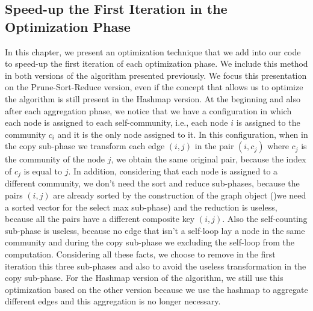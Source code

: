 \subsection{Speed-up the First Iteration in the Optimization Phase}\label{f-1}
In this chapter, we present an optimization technique that we add into our code to speed-up the first iteration of each optimization phase. We include this method in both versions of the algorithm presented previously. We focus this presentation on the Prune-Sort-Reduce version, even if the concept that allows us to optimize the algorithm is still present in the Hashmap version. At the beginning and also after each aggregation phase, we notice that we have a configuration in which each node is assigned to each self-community, i.e., each node $i$ is assigned to the community $c_i$ and it is the only node assigned to it. In this configuration, when in the copy sub-phase we transform each edge $(i,j)$ in the pair $(i,c_j)$ where $c_j$ is the community of the node $j$, we obtain the same original pair, because the index of $c_j$ is equal to $j$. In addition, considering that each node is assigned to a different community, we don't need the sort and reduce sub-phases, because the pairs $(i, j)$ are already sorted by the construction of the graph object ()we need a sorted vector for the select max sub-phase) and the reduction is useless, because all the pairs have a different composite key $(i, j)$.
Also the self-counting sub-phase is useless, because no edge that isn't a self-loop lay a node in the same community and during the copy sub-phase we excluding the self-loop from the computation. 
Considering all these facts, we choose to remove in the first iteration this three sub-phases and also to avoid the useless transformation in the copy sub-phase. For the Hashmap version of the algorithm, we still use this optimization based on the other version because we use the hashmap to aggregate different edges and this aggregation is no longer necessary.


